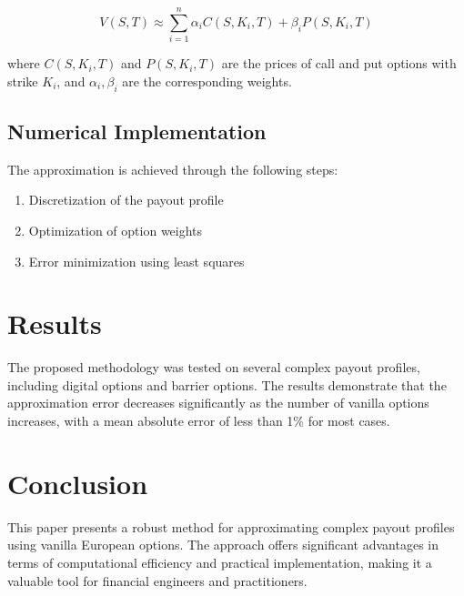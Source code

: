 \documentclass[12pt]{article}
\begin{document}
\begin{equation}
V(S, T) \approx \sum_{i=1}^{n} \alpha_i C(S, K_i, T) + \beta_i P(S, K_i, T)
\end{equation}

where \( C(S, K_i, T) \) and \( P(S, K_i, T) \) are the prices of call and put options with strike \( K_i \), and \( \alpha_i, \beta_i \) are the corresponding weights.

\subsection{Numerical Implementation}
The approximation is achieved through the following steps:
\begin{enumerate}
    \item Discretization of the payout profile
    \item Optimization of option weights
    \item Error minimization using least squares
\end{enumerate}

\section{Results}
The proposed methodology was tested on several complex payout profiles, including digital options and barrier options. The results demonstrate that the approximation error decreases significantly as the number of vanilla options increases, with a mean absolute error of less than 1\% for most cases.

\section{Conclusion}
This paper presents a robust method for approximating complex payout profiles using vanilla European options. The approach offers significant advantages in terms of computational efficiency and practical implementation, making it a valuable tool for financial engineers and practitioners.



\end{document}
